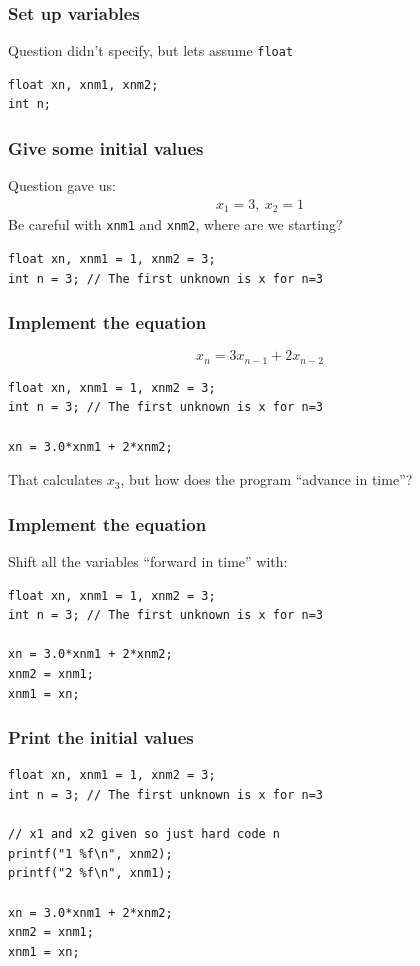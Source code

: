 \documentclass[14pt]{beamer}
\begin{document}
\begin{frame}[fragile]
\frametitle{Set up variables}
Question didn't specify, but lets assume \texttt{float}
\begin{lstlisting}[style=CStyle]
float xn, xnm1, xnm2;
int n; 
\end{lstlisting}
\end{frame}

\begin{frame}[fragile]
\frametitle{Give some initial values}
Question gave us:
\begin{align*}
x_1 = 3,~ x_2 = 1
\end{align*}
Be careful with \texttt{xnm1} and \texttt{xnm2}, where are we starting? 
\begin{lstlisting}[style=CStyle]
float xn, xnm1 = 1, xnm2 = 3;
int n = 3; // The first unknown is x for n=3
\end{lstlisting}
\end{frame}

\begin{frame}[fragile]
\frametitle{Implement the equation}
\begin{equation*}
x_n = 3x_{n-1} + 2x_{n-2}
\end{equation*}
\begin{lstlisting}[style=CStyle]
float xn, xnm1 = 1, xnm2 = 3;
int n = 3; // The first unknown is x for n=3

xn = 3.0*xnm1 + 2*xnm2;
\end{lstlisting}
That calculates $x_3$, but how does the program ``advance in time''?
\end{frame}

\begin{frame}[fragile]
\frametitle{Implement the equation}
Shift all the variables ``forward in time'' with:
\begin{lstlisting}[style=CStyle]
float xn, xnm1 = 1, xnm2 = 3;
int n = 3; // The first unknown is x for n=3

xn = 3.0*xnm1 + 2*xnm2;
xnm2 = xnm1;
xnm1 = xn;
\end{lstlisting}
\end{frame}

\begin{frame}[fragile]
\frametitle{Print the initial values}
\begin{lstlisting}[style=CStyle]
float xn, xnm1 = 1, xnm2 = 3;
int n = 3; // The first unknown is x for n=3

// x1 and x2 given so just hard code n
printf("1 %f\n", xnm2);
printf("2 %f\n", xnm1);

xn = 3.0*xnm1 + 2*xnm2;
xnm2 = xnm1;
xnm1 = xn;
\end{lstlisting}
\end{frame}
\end{document}
